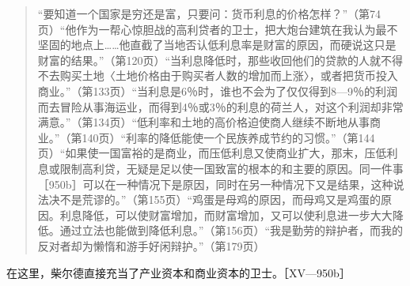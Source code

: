 \begin{quote}{“要知道一个国家是穷还是富，只要问：货币利息的价格怎样？”（第74页）“他作为一帮心惊胆战的高利贷者的卫士，把大炮台建筑在我认为最不坚固的地点上……他直截了当地否认低利息率是财富的原因，而硬说这只是财富的结果。”（第120页）“当利息降低时，那些收回他们的贷款的人就不得不去购买土地〈土地价格由于购买者人数的增加而上涨〉，或者把货币投入商业。”（第133页）“当利息是6％时，谁也不会为了仅仅得到8—9％的利润而去冒险从事海运业，而得到4％或3％的利息的荷兰人，对这个利润却非常满意。”（第134页）“低利率和土地的高价格迫使商人继续不断地从事商业。”（第140页）“利率的降低能使一个民族养成节约的习惯。”（第144页）“如果使一国富裕的是商业，而压低利息又使商业扩大，那末，压低利息或限制高利贷，无疑是足以使一国致富的根本的和主要的原因。同一件事［950b］可以在一种情况下是原因，同时在另一种情况下又是结果，这种说法决不是荒谬的。”（第155页）“鸡蛋是母鸡的原因，而母鸡又是鸡蛋的原因。利息降低，可以使财富增加，而财富增加，又可以使利息进一步大大降低。通过立法也能做到降低利息。”（第156页）“我是勤劳的辩护者，而我的反对者却为懒惰和游手好闲辩护。”（第179页）}\end{quote}

在这里，柴尔德直接充当了产业资本和商业资本的卫士。［XV—950b］

